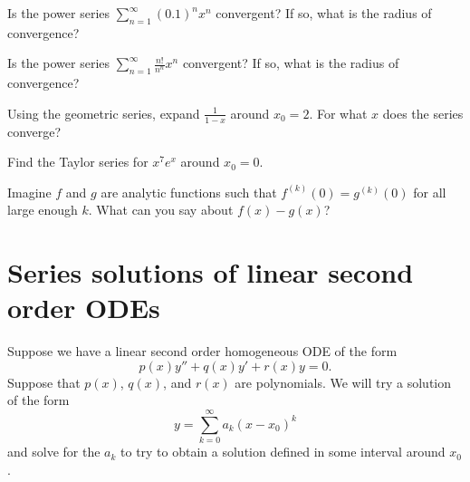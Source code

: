 \documentclass[12pt]{book}
\begin{document}
\setcounter{exercise}{100}

\begin{exercise}
Is the power series
$\displaystyle \sum_{n=1}^\infty {(0.1)}^n x^n$
convergent? If so, what is the radius of convergence?
\end{exercise}

\begin{exercise}[challenging]
Is the power series
$\displaystyle \sum_{n=1}^\infty \frac{n!}{n^n} x^n$
convergent? If so, what is the radius of convergence?
\end{exercise}

\begin{exercise}
Using the geometric series, expand $\frac{1}{1-x}$ around $x_0=2$.
For what $x$ does the series converge?
\end{exercise}

\begin{exercise}[challenging]
Find the Taylor series for $x^7 e^x$ around $x_0 = 0$.
\end{exercise}

\begin{exercise}[challenging]
Imagine $f$ and $g$ are analytic functions such that
$f^{(k)}(0) = g^{(k)}(0)$ for all large enough $k$.  What can you
say about $f(x)-g(x)$?
\end{exercise}


\sectionnewpage
\section{Series solutions of linear second order ODEs}


Suppose we have a linear second order homogeneous ODE of the form
\begin{equation*}
p(x) y'' + q(x) y' + r(x) y = 0 .
\end{equation*}
Suppose that $p(x)$, $q(x)$, and $r(x)$ are polynomials.  We will 
try a solution of the form
\begin{equation*}
y = \sum_{k=0}^\infty a_k {(x-x_0)}^k
\end{equation*}
and solve for the $a_k$ to try to obtain a solution defined in some
interval around $x_0$.
\end{document}
